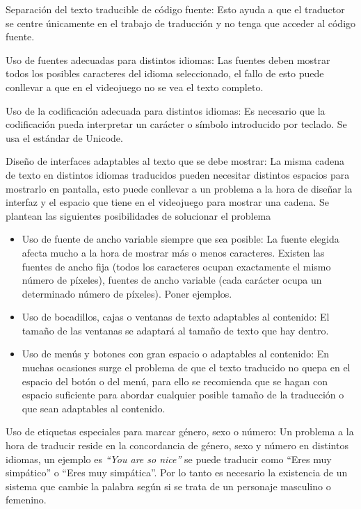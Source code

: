 Separación del texto traducible de código fuente: Esto ayuda a que el traductor se centre únicamente en el trabajo de traducción y no tenga que acceder al código fuente.

Uso de fuentes adecuadas para distintos idiomas: Las fuentes deben mostrar todos los posibles caracteres del idioma seleccionado, el fallo de esto puede conllevar a que en el videojuego no se vea el texto completo.

Uso de la codificación adecuada para distintos idiomas: Es necesario que la codificación pueda interpretar un carácter o símbolo introducido por teclado. Se usa el estándar de Unicode.

Diseño de interfaces adaptables al texto que se debe mostrar: La misma cadena de texto en distintos idiomas traducidos pueden necesitar distintos espacios para mostrarlo en pantalla, esto puede conllevar a un problema a la hora de diseñar la interfaz y el espacio que tiene en el videojuego para mostrar una cadena.
Se plantean las siguientes posibilidades de solucionar el problema

\begin{itemize}
\item Uso de fuente de ancho variable siempre que sea posible: La fuente elegida afecta mucho a la hora de mostrar más o menos caracteres. Existen las fuentes de ancho fija (todos los caracteres ocupan exactamente el mismo número de píxeles), fuentes de ancho variable (cada carácter ocupa un determinado número de píxeles). Poner ejemplos.
\item Uso de bocadillos, cajas o ventanas de texto adaptables al contenido: El tamaño de las ventanas se adaptará al tamaño de texto que hay dentro.
\item Uso de menús y botones con gran espacio o adaptables al contenido: En muchas ocasiones surge el problema de que el texto traducido no quepa en el espacio del botón o del menú, para ello se recomienda que se hagan con espacio suficiente para abordar cualquier posible tamaño de la traducción o que sean adaptables al contenido.
\end{itemize}

Uso de etiquetas especiales para marcar género, sexo o número: Un problema a la hora de traducir reside en la concordancia de género, sexo y número en distintos idiomas, un ejemplo es \textit{``You are so nice''} se puede traducir como ``Eres muy simpático'' o ``Eres muy simpática''. Por lo tanto es necesario la existencia de un sistema que cambie la palabra según si se trata de un personaje masculino o femenino.

